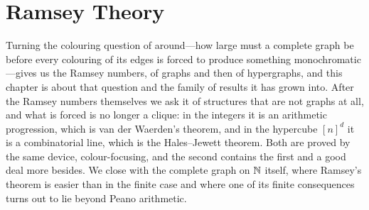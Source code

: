 \chapter{Ramsey Theory} \label{Ch6:CH}
\thispagestyle{empty}

Turning the colouring question of  around---how large must a complete graph be before every colouring of its edges is forced to produce something monochromatic---gives us the Ramsey numbers, of graphs and then of hypergraphs, and this chapter is about that question and the family of results it has grown into. After the Ramsey numbers themselves we ask it of structures that are not graphs at all, and what is forced is no longer a clique: in the integers it is an arithmetic progression, which is van der Waerden's theorem, and in the hypercube $[n]^d$ it is a combinatorial line, which is the Hales--Jewett theorem. Both are proved by the same device, colour-focusing, and the second contains the first and a good deal more besides. We close with the complete graph on $\mathbb{N}$ itself, where Ramsey's theorem is easier than in the finite case and where one of its finite consequences turns out to lie beyond Peano arithmetic.





